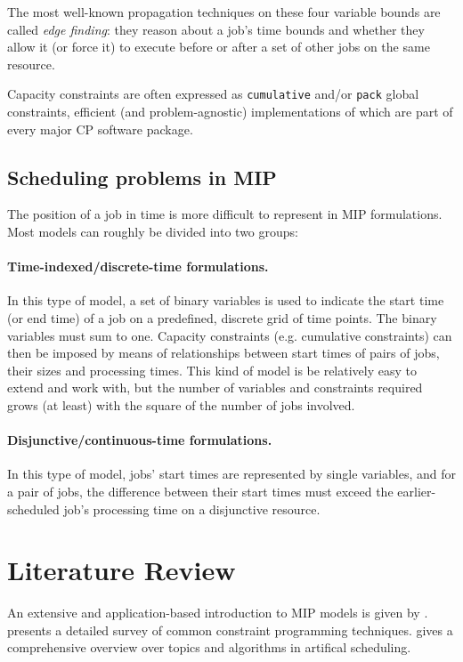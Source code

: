 \documentclass[13pt, letterpaper, oneside]{book}
\begin{document}
The most well-known propagation techniques on these four variable bounds are
called \textit{edge finding}: they reason about a job's time bounds and whether
they allow it (or force it) to execute before or after a set of other jobs on
the same resource.

Capacity constraints are often expressed as \texttt{cumulative} and/or
\texttt{pack} global constraints, efficient (and problem-agnostic)
implementations of which are part of every major CP software package.

\subsection{Scheduling problems in MIP}
The position of a job in time is more difficult to represent in MIP
formulations. Most models can roughly be divided into two groups:

\paragraph{Time-indexed/discrete-time formulations.} In this type of model, a set of binary
variables is used to indicate the start time (or end time) of a job on a
predefined, discrete grid of time points. The binary variables must sum to one.
Capacity constraints (e.g. cumulative constraints) can then be imposed by means
of relationships between start times of pairs of jobs, their sizes and
processing times. This kind of model is be relatively easy to extend and work
with, but the number of variables and constraints required grows (at least) with
the square of the number of jobs involved.

\paragraph{Disjunctive/continuous-time formulations.}
In this type of model, jobs' start times are represented by single variables,
and for a pair of jobs, the difference between their start times must exceed the
earlier-scheduled job's processing time on a disjunctive resource.

\section{Literature Review}
\label{sec:backgroundlit}
An extensive and application-based introduction to MIP models is given by
\citet{williams}. \citet{bartak} presents a detailed survey of common constraint
programming techniques. \citet{pinedo} gives a comprehensive overview over
topics and algorithms in artifical scheduling.
\end{document}
